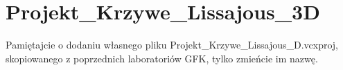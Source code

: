 \chapter{Projekt\+\_\+\+Krzywe\+\_\+\+Lissajous\+\_\+3D}
\hypertarget{md__r_e_a_d_m_e}{}\label{md__r_e_a_d_m_e}
\label{md__r_e_a_d_m_e_autotoc_md0}%
%
 Pamiętajcie o dodaniu własnego pliku Projekt\+\_\+\+Krzywe\+\_\+\+Lissajous\+\_\+D.\+vcxproj, skopiowanego z poprzednich laboratoriów GFK, tylko zmieńcie im nazwę. 